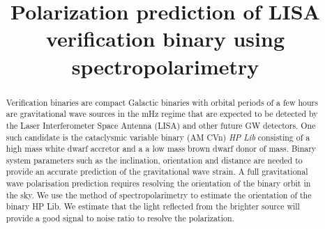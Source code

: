 \documentclass[10pt,a4paper]{article}
\title{
Polarization prediction of LISA verification binary using spectropolarimetry
}
\begin{document}
\maketitle

\begin{abstract}
Verification binaries are compact Galactic binaries with orbital periods of a few hours are gravitational wave sources in the mHz regime that are expected to be detected by the Laser Interferometer Space Antenna (LISA) and other future GW detectors. One such candidate is the cataclysmic variable binary (AM CVn) \emph{HP Lib} consisting of a high mass white dwarf accretor and a a low mass brown dwarf  donor of mass. Binary system parameters such as the inclination, orientation and distance are needed to provide an accurate prediction of the gravitational wave strain. A full gravitational wave polarisation prediction requires resolving the orientation of the binary orbit in the sky. We use the method of  spectropolarimetry to estimate the orientation of the binary HP Lib. We estimate that the light reflected from the brighter source will provide a good signal to noise ratio to resolve the polarization. 

\end{abstract}
\end{document}
